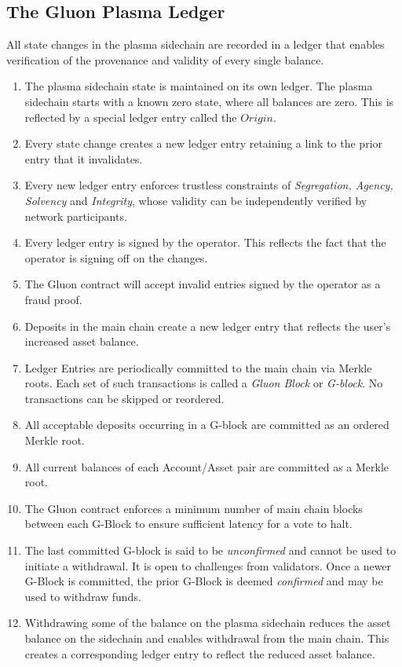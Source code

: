 \documentclass[12pt,a4paper]{article}
\begin{document}
\subsection{The Gluon Plasma Ledger}
All state changes in the plasma sidechain are recorded in a ledger that enables verification of the provenance and validity of every single balance.
\begin{enumerate}
    \item The plasma sidechain state is maintained on its own ledger. The plasma sidechain starts with a known zero state, where all balances are zero. This is reflected by a special ledger entry called the $Origin$.
    \item Every state change creates a new ledger entry retaining a link to the prior entry that it invalidates.
    \item Every new ledger entry enforces trustless constraints of \emph{Segregation, Agency, Solvency} and \emph{Integrity}, whose validity can be independently verified by network participants.
    \item Every ledger entry is signed by the operator. This reflects the fact that the operator is signing off on the changes.
    \item The Gluon contract will accept invalid entries signed by the operator as a fraud proof.
    \item Deposits in the main chain create a new ledger entry that reflects the user’s increased asset balance.
    \item Ledger Entries are periodically committed to the main chain via Merkle roots. Each set of such transactions is called a \emph{Gluon Block} or \emph{G-block}. No transactions can be skipped or reordered.
    \item All acceptable deposits occurring in a G-block are committed as an ordered Merkle root.
    \item All current  balances of each Account/Asset pair are committed as a Merkle root.
    \item The Gluon contract enforces a minimum number of main chain blocks between each G-Block to ensure sufficient latency for a vote to halt.
    \item The last committed G-block is said to be \emph{unconfirmed} and cannot be used to initiate a withdrawal. It is open to challenges from validators. Once a newer G-Block is committed, the prior G-Block is deemed \emph{confirmed} and may be used to withdraw funds.
    \item Withdrawing some of the balance on the plasma sidechain reduces the asset balance on the sidechain and enables withdrawal from the main chain. This creates a corresponding ledger entry to reflect the reduced asset balance.
\end{enumerate}
\end{document}

